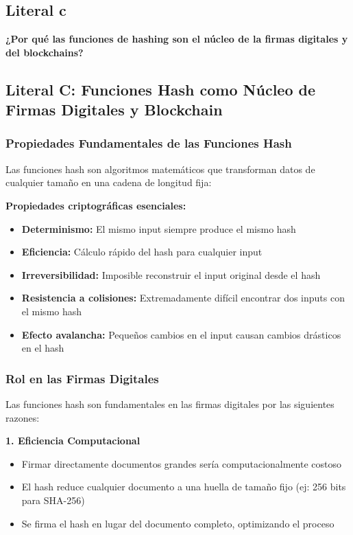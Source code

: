 {\subsection{Literal c}
\textbf{¿Por qué las funciones de hashing son el núcleo de la firmas digitales y del blockchains?}

\subsection{Literal C: Funciones Hash como Núcleo de Firmas Digitales y Blockchain}

\subsubsection{Propiedades Fundamentales de las Funciones Hash}

Las funciones hash son algoritmos matemáticos que transforman datos de cualquier tamaño en una cadena de longitud fija:

\textbf{Propiedades criptográficas esenciales:}
\begin{itemize}
    \item \textbf{Determinismo:} El mismo input siempre produce el mismo hash
    \item \textbf{Eficiencia:} Cálculo rápido del hash para cualquier input
    \item \textbf{Irreversibilidad:} Imposible reconstruir el input original desde el hash
    \item \textbf{Resistencia a colisiones:} Extremadamente difícil encontrar dos inputs con el mismo hash
    \item \textbf{Efecto avalancha:} Pequeños cambios en el input causan cambios drásticos en el hash
\end{itemize}

\subsubsection{Rol en las Firmas Digitales}

Las funciones hash son fundamentales en las firmas digitales por las siguientes razones:

\textbf{1. Eficiencia Computacional}
\begin{itemize}
    \item Firmar directamente documentos grandes sería computacionalmente costoso
    \item El hash reduce cualquier documento a una huella de tamaño fijo (ej: 256 bits para SHA-256)
    \item Se firma el hash en lugar del documento completo, optimizando el proceso
\end{itemize}

}
